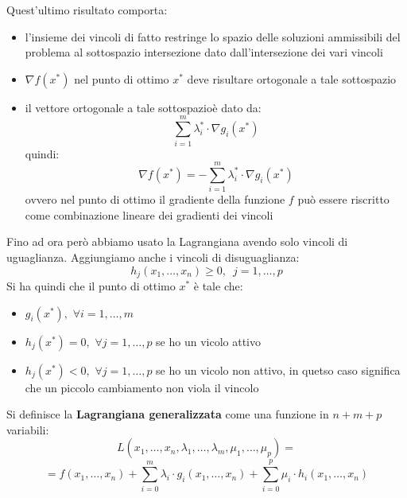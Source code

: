 \documentclass[a4paper,12pt, oneside]{book}
\begin{document}
Quest'ultimo risultato comporta:
\begin{itemize}
  \item l'insieme dei vincoli di fatto restringe lo spazio delle
  soluzioni ammissibili del problema al sottospazio intersezione
  dato dall’intersezione dei vari vincoli
  \item $\nabla f(x^*)$ nel punto di ottimo $x^*$ deve risultare
  ortogonale a tale sottospazio
  \item il vettore ortogonale a tale sottospazioè dato da:
  \[\sum_{i=1}^m\lambda_i^*\cdot \nabla g_i(x^*)\]
  quindi:
  \[\nabla f(x^*)=-\sum_{i=1}^m\lambda_i^*\cdot \nabla g_i(x^*)\]
  ovvero  nel punto di ottimo il gradiente della funzione $f$ può
  essere riscritto come combinazione lineare dei gradienti dei vincoli 
\end{itemize}
Fino ad ora però abbiamo usato la Lagrangiana avendo solo vincoli di
uguaglianza. Aggiungiamo anche i vincoli di disuguaglianza:
\[h_j(x_1,\ldots,x_n)\geq 0,\,\,\,j=1,\ldots,p\]
Si ha quindi che il punto di ottimo $x^*$ è tale che:
\begin{itemize}
  \item $g_i(x^*),\,\,\forall i=1,\ldots,m$
  \item $h_j(x^*)=0,\,\,\forall j=1,\ldots,p$ se ho un vicolo attivo
  \item $h_j(x^*)<0,\,\,\forall j=1,\ldots,p$ se ho un vicolo non
  attivo, in quetso caso significa che un piccolo cambiamento non viola
  il vincolo 
\end{itemize}
Si definisce la \textbf{Lagrangiana generalizzata} come una funzione
in $n+m+p$ variabili:
\[L(x_1,\ldots,x_n,\lambda_1,\ldots,\lambda_m,\mu_1,\ldots,\mu_p)=\]
\[=f(x_1,\ldots,x_n)+ \sum_{i=0}^m\lambda_i\cdot g_i(x_1,\ldots,x_n)+
  \sum_{i=0}^p\mu_i\cdot h_i(x_1,\ldots,x_n)\]
\end{document}
